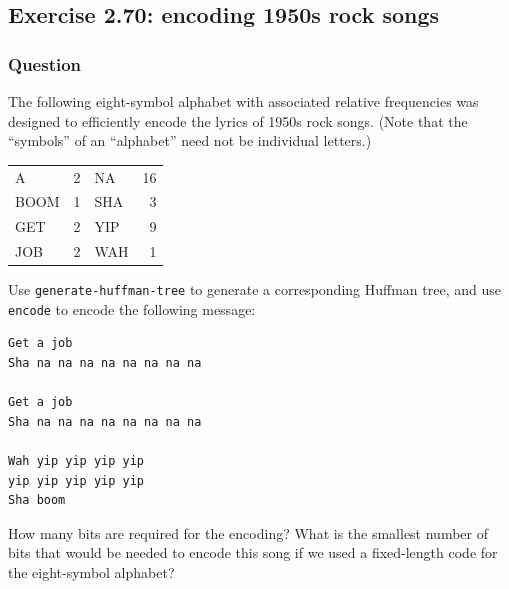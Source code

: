 \documentclass[final,fleqn,titlepage,twoside]{article}
\begin{document}
\subsection{Exercise 2.70: encoding 1950s rock songs}
\label{sec:org14d9f2e}
\subsubsection{Question}
\label{sec:org3d981cb}
The following eight-symbol alphabet with associated relative frequencies was
designed to efficiently encode the lyrics of 1950s rock songs. (Note that the
“symbols” of an “alphabet” need not be individual letters.)


\begin{center}
\begin{tabular}{lrlr}
A & 2 & NA & 16\\[0pt]
BOOM & 1 & SHA & 3\\[0pt]
GET & 2 & YIP & 9\\[0pt]
JOB & 2 & WAH & 1\\[0pt]
\end{tabular}
\end{center}

Use \texttt{generate-huffman-tree} to generate a corresponding Huffman tree,
and use \texttt{encode} to encode the following message:

\begin{verbatim}
Get a job
Sha na na na na na na na na

Get a job
Sha na na na na na na na na

Wah yip yip yip yip 
yip yip yip yip yip
Sha boom
\end{verbatim}

How many bits are required for the encoding? What is the smallest number of bits
that would be needed to encode this song if we used a fixed-length code for the
eight-symbol alphabet?
\end{document}

